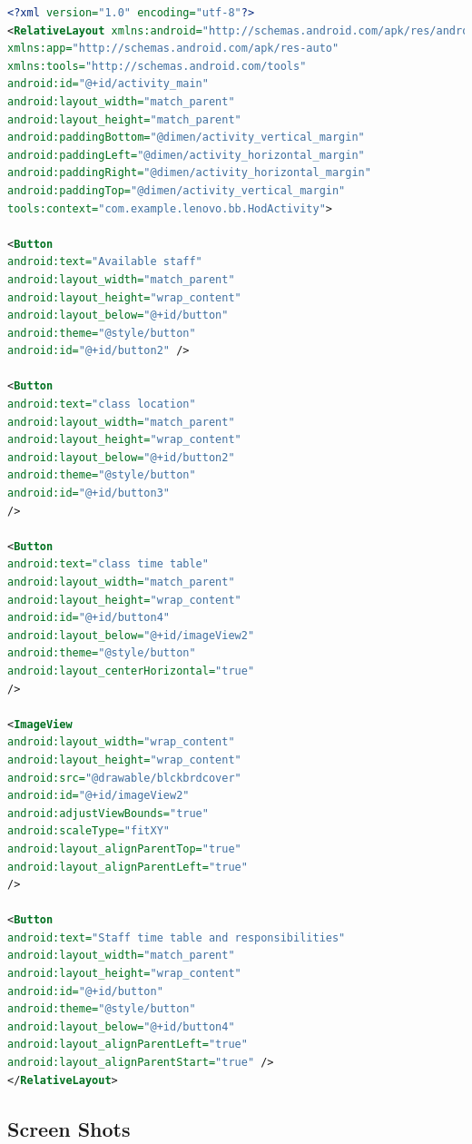 \documentclass[BTech]{srmuthesis}
\begin{document}
\begin{lstlisting}[language=XML,caption={Faculty Dashboard}, label={lst:faculty-dashboard}]
<?xml version="1.0" encoding="utf-8"?>
<RelativeLayout xmlns:android="http://schemas.android.com/apk/res/android"
xmlns:app="http://schemas.android.com/apk/res-auto"
xmlns:tools="http://schemas.android.com/tools"
android:id="@+id/activity_main"
android:layout_width="match_parent"
android:layout_height="match_parent"
android:paddingBottom="@dimen/activity_vertical_margin"
android:paddingLeft="@dimen/activity_horizontal_margin"
android:paddingRight="@dimen/activity_horizontal_margin"
android:paddingTop="@dimen/activity_vertical_margin"
tools:context="com.example.lenovo.bb.HodActivity">

<Button
android:text="Available staff"
android:layout_width="match_parent"
android:layout_height="wrap_content"
android:layout_below="@+id/button"
android:theme="@style/button"
android:id="@+id/button2" />

<Button
android:text="class location"
android:layout_width="match_parent"
android:layout_height="wrap_content"
android:layout_below="@+id/button2"
android:theme="@style/button"
android:id="@+id/button3"
/>

<Button
android:text="class time table"
android:layout_width="match_parent"
android:layout_height="wrap_content"
android:id="@+id/button4"
android:layout_below="@+id/imageView2"
android:theme="@style/button"
android:layout_centerHorizontal="true"
/>

<ImageView
android:layout_width="wrap_content"
android:layout_height="wrap_content"
android:src="@drawable/blckbrdcover"
android:id="@+id/imageView2"
android:adjustViewBounds="true"
android:scaleType="fitXY"
android:layout_alignParentTop="true"
android:layout_alignParentLeft="true"
/>

<Button
android:text="Staff time table and responsibilities"
android:layout_width="match_parent"
android:layout_height="wrap_content"
android:id="@+id/button"
android:theme="@style/button"
android:layout_below="@+id/button4"
android:layout_alignParentLeft="true"
android:layout_alignParentStart="true" />
</RelativeLayout>
\end{lstlisting}
\subsection{Screen Shots}
\end{document}
